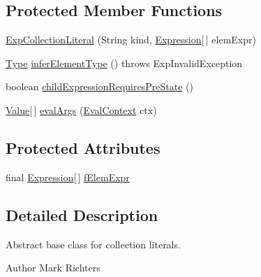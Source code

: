 \subsection*{Protected Member Functions}
\begin{DoxyCompactItemize}
\item 
\hyperlink{classorg_1_1tzi_1_1use_1_1uml_1_1ocl_1_1expr_1_1_exp_collection_literal_a4d77d1db887f38de3bc8b4058158a500}{Exp\-Collection\-Literal} (String kind, \hyperlink{classorg_1_1tzi_1_1use_1_1uml_1_1ocl_1_1expr_1_1_expression}{Expression}\mbox{[}$\,$\mbox{]} elem\-Expr)
\item 
\hyperlink{interfaceorg_1_1tzi_1_1use_1_1uml_1_1ocl_1_1type_1_1_type}{Type} \hyperlink{classorg_1_1tzi_1_1use_1_1uml_1_1ocl_1_1expr_1_1_exp_collection_literal_a74392d4b06bfa26db67b78363e9159b1}{infer\-Element\-Type} ()  throws Exp\-Invalid\-Exception     
\item 
boolean \hyperlink{classorg_1_1tzi_1_1use_1_1uml_1_1ocl_1_1expr_1_1_exp_collection_literal_aa036f445c721a364c418b59245f915e3}{child\-Expression\-Requires\-Pre\-State} ()
\item 
\hyperlink{classorg_1_1tzi_1_1use_1_1uml_1_1ocl_1_1value_1_1_value}{Value}\mbox{[}$\,$\mbox{]} \hyperlink{classorg_1_1tzi_1_1use_1_1uml_1_1ocl_1_1expr_1_1_exp_collection_literal_aa346d293d5e6020d99b3be9d639dddca}{eval\-Args} (\hyperlink{classorg_1_1tzi_1_1use_1_1uml_1_1ocl_1_1expr_1_1_eval_context}{Eval\-Context} ctx)
\end{DoxyCompactItemize}
\subsection*{Protected Attributes}
\begin{DoxyCompactItemize}
\item 
final \hyperlink{classorg_1_1tzi_1_1use_1_1uml_1_1ocl_1_1expr_1_1_expression}{Expression}\mbox{[}$\,$\mbox{]} \hyperlink{classorg_1_1tzi_1_1use_1_1uml_1_1ocl_1_1expr_1_1_exp_collection_literal_ae90c09353fd0e5dc925b60fd7409e40c}{f\-Elem\-Expr}
\end{DoxyCompactItemize}


\subsection{Detailed Description}
Abstract base class for collection literals.

\begin{DoxyAuthor}{Author}
Mark Richters 
\end{DoxyAuthor}


